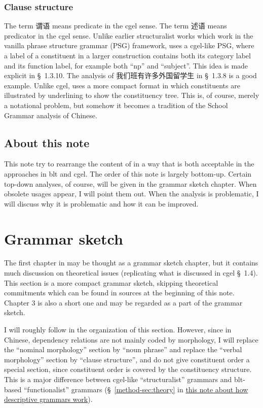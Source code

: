 \documentclass[UTF8, a4paper, oneside, scheme=plain]{ctexart}
\newcommand*{\citesec}[1]{\S~{#1}}
\newcommand{\method}{\href{../methodology/glossing.pdf}{this note about how descriptive grammars work}}
\begin{document}
\subsubsection{Clause structure}

The term 谓语 means predicate in the \ac{cgel} sense.
The term 述语 means predicator in the \ac{cgel} sense.
Unlike earlier structuralist works which work in the vanilla phrase structure grammar (PSG) framework,
\citet{zhudexigrammar} uses a \ac{cgel}-like PSG,
where a label of a constituent in a larger construction 
contains both its category label and its function label,
for example both ``\ac{np}'' and ``subject''.
This idea is made explicit in \citesec{1.3.10}.
The analysis of 我们班有许多外国留学生 in \citesec{1.3.8} is a good example.
Unlike \ac{cgel},
\citet{zhudexigrammar} uses a more compact format 
in which constituents are illustrated by underlining 
to show the constituency tree.
This is, of course, merely a notational problem,
but somehow it becomes a tradition of the School Grammar analysis of Chinese.

\subsection{About this note}

This note try to rearrange the content of \citet{zhudexigrammar}
in a way that is both acceptable in the approaches in \ac{blt} and \ac{cgel}.
The order of this note is largely bottom-up.
Certain top-down analyses, of course, will be given in the grammar sketch chapter.
When obsolete usages appear, I will point them out.
When the analysis is problematic, I will discuss why it is problematic and how it can be improved.

\section{Grammar sketch}

The first chapter in \citet{zhudexigrammar} may be thought as a grammar sketch chapter,
but it contains much discussion on theoretical issues
(replicating what is discussed in \ac{cgel} \citesec{1.4}).
This section is a more compact grammar sketch,
skipping theoretical commitments which can be found in sources at the beginning of this note.
Chapter 3 is also a short one and may be regarded as a part of the grammar sketch.

I will roughly follow \citet{jacques2021grammar} in the organization of this section.
However, since in Chinese, dependency relations are not mainly coded by morphology,
I will replace the ``nominal morphology'' section by ``noun phrase''
and replace the ``verbal morphology'' section by ``clause structure'',
and do not give constituent order a special section,
since constituent order is covered by the constituency structure.
This is a major difference between \ac{cgel}-like ``structuralist'' grammars 
and \ac{blt}-based ``functionalist'' grammars
(\citesec{\ref{method-sec:theory}} in \method).
\end{document}
